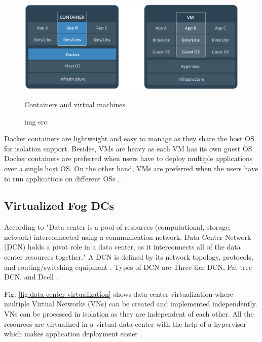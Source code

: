 \begin{figure}[H]
    \centering
    \includegraphics[width=\textwidth]{image/Containers and virtual machines.png}
    \caption{Containers and virtual machines}
    \caption*{img src: \cite{doc}}
    \label{fig:containers and virtual machines}
\end{figure}

Docker containers are lightweight and easy to manage as they share the host OS for isolation support. Besides, VMs are heavy as each VM has its own guest OS. Docker containers are preferred when users have to deploy multiple applications over a single host OS. On the other hand, VMs are preferred when the users have to run applications on different OSs \cite{doc}, \cite{avi}. 


\subsection{Virtualized Fog DCs}

According to \cite{wiki:xxx} "Data center is a pool of resources (computational, storage, network) interconnected using a communication network. Data Center Network (DCN) holds a pivot role in a data center, as it interconnects all of the data center resources together." A DCN is defined by its network topology, protocols, and routing/switching equipment \cite{mukherjee2018survey}. Types of DCN are Three-tier DCN, Fat tree DCN, and Dcell \cite{wiki:xxx}. \par
Fig. \ref{fig:data center virtualization} shows data center virtualization where multiple Virtual Networks (VNs) can be created and implemented independently. VNs can be processed in isolation as they are independent of each other. All the resources are virtualized  in a virtual data center with the help of a hypervisor which makes application deployment easier \cite{mukherjee2018survey}. \par

